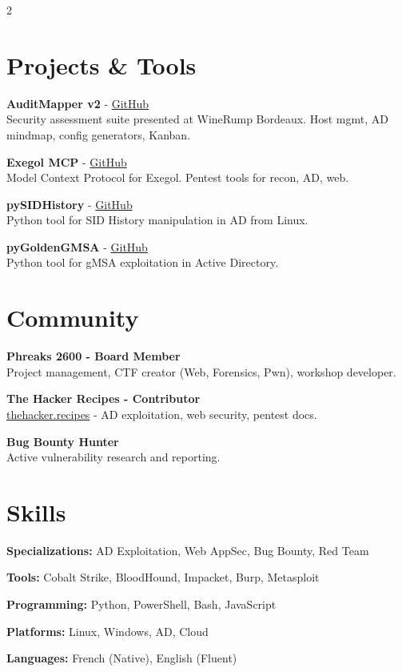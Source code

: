 \documentclass[10pt,a4paper]{article}
\begin{document}
\begin{multicols}{2}

\section{Projects \& Tools}

\textbf{AuditMapper v2} - \href{https://github.com/felixbillieres/AuditMapperV2}{GitHub} \\
Security assessment suite presented at WineRump Bordeaux. Host mgmt, AD mindmap, config generators, Kanban.

\textbf{Exegol MCP} - \href{https://github.com/ThePorgs/Exegol-MCP}{GitHub} \\
Model Context Protocol for Exegol. Pentest tools for recon, AD, web.

\textbf{pySIDHistory} - \href{https://github.com/felixbillieres/pySIDHistory}{GitHub} \\
Python tool for SID History manipulation in AD from Linux.

\textbf{pyGoldenGMSA} - \href{https://github.com/felixbillieres/pyGoldenGMSA}{GitHub} \\
Python tool for gMSA exploitation in Active Directory.

\columnbreak

\section{Community}

\textbf{Phreaks 2600 - Board Member} \\
Project management, CTF creator (Web, Forensics, Pwn), workshop developer.

\textbf{The Hacker Recipes - Contributor} \\
\href{https://thehacker.recipes}{thehacker.recipes} - AD exploitation, web security, pentest docs.

\textbf{Bug Bounty Hunter} \\
Active vulnerability research and reporting.

\section{Skills}

\textbf{Specializations:} AD Exploitation, Web AppSec, Bug Bounty, Red Team

\textbf{Tools:} Cobalt Strike, BloodHound, Impacket, Burp, Metasploit

\textbf{Programming:} Python, PowerShell, Bash, JavaScript

\textbf{Platforms:} Linux, Windows, AD, Cloud

\textbf{Languages:} French (Native), English (Fluent)

\end{multicols}
\end{document}
